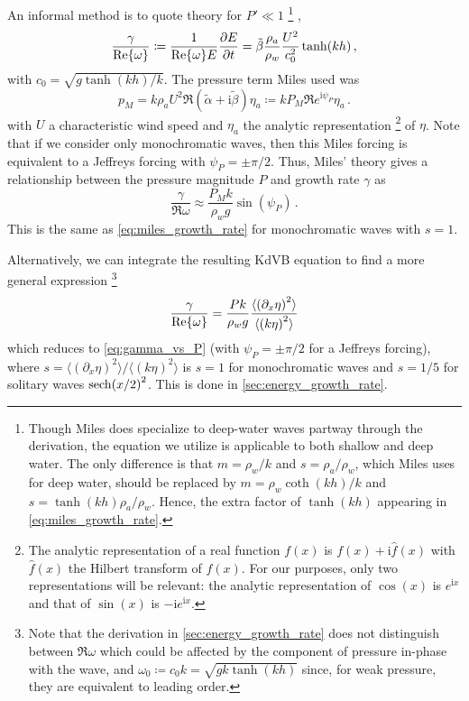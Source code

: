 \documentclass{jfm}
\newcommand{\im}{\mathrm{i}}
\begin{document}
An informal method is to quote \citet{miles1957generation} theory for
$P' \ll 1$%
\footnote{
  \label{foot:miles_shallow}
  Though Miles does specialize to deep-water waves partway through the
  derivation, the equation we utilize is applicable to both shallow and
  deep water.
  The only difference is that $m = \rho_w/k$ and $s=\rho_a/\rho_w$,
  which Miles uses for deep water, should be replaced by
  $m=\rho_w\coth(kh)/k$ and $s = \tanh(kh) \rho_a/\rho_w$.
  Hence, the extra factor of $\tanh(kh)$ appearing in
  \cref{eq:miles_growth_rate}.
}%
,
\begin{equation}
  \frac{\gamma}{\Re{\omega}} \coloneqq
  \frac{1}{\Re{\omega} E} \pdv{E}{t}
  = \tilde{\beta} \frac{\rho_a}{\rho_w} \frac{U^2}{c_0^2} \tanh(kh) \,,
  \label{eq:miles_growth_rate}
\end{equation}
with $c_0 = \sqrt{g\tanh(kh)/k}$.
The pressure term Miles used was
\begin{equation}
  p_M = k \rho_a U^2 \Re{(\tilde{\alpha} + \im \tilde{\beta}) \eta_a}
  \coloneqq k P_M \Re{ e^{\im \psi_P} \eta_a} \,.
\end{equation}
with $U$ a characteristic wind speed and $\eta_a$ the analytic
representation%
\footnote{
  The analytic representation of a real function $f(x)$ is $f(x) + \im
  \hat{f}(x)$ with $\hat{f}(x)$ the Hilbert transform of $f(x)$.
  For our purposes, only two representations will be relevant: the
  analytic representation of $\cos(x)$ is $e^{\im x}$ and that of
  $\sin(x)$ is $-\im e^{\im x}$.
}
of $\eta$.
Note that if we consider only monochromatic waves, then this Miles
forcing is equivalent to a Jeffreys forcing with $\psi_P = \pm \pi/2$.
Thus, Miles' theory gives a relationship between the pressure magnitude
$P$ and growth rate $\gamma$ as
\begin{equation}
  \frac{\gamma}{\Re{\omega}} \approx \frac{P_M k}{\rho_w g} \sin(\psi_P)
  \,.
\end{equation}
This is the same as \cref{eq:miles_growth_rate} for monochromatic waves
with $s=1$.

Alternatively, we can integrate the resulting KdVB equation to find a
more general expression%
\footnote{
  Note that the derivation in \cref{sec:energy_growth_rate} does not
  distinguish between $\Re{\omega}$ which could be affected by the
  component of pressure in-phase with the wave, and $\omega_0 \coloneqq
  c_0 k = \sqrt{gk \tanh(kh)}$ since, for weak pressure, they are
  equivalent to leading order.
}
\begin{equation}
  \frac{\gamma}{\Re{\omega}} = \frac{P k}{\rho_w g} \frac{\langle
  \pqty{\partial_x \eta}^2 \rangle}{\langle \pqty{k \eta}^2 \rangle}
\end{equation}
which reduces to \cref{eq:gamma_vs_P} (with $\psi_P = \pm \pi/2$ for a
Jeffreys forcing), where $s = \langle(\partial_x \eta)^2\rangle/
\langle(k \eta)^2\rangle$ is $s=1$ for monochromatic waves and $s=1/5$
for solitary waves $\sech(x/2)^2$.
This is done in \cref{sec:energy_growth_rate}.
\end{document}

